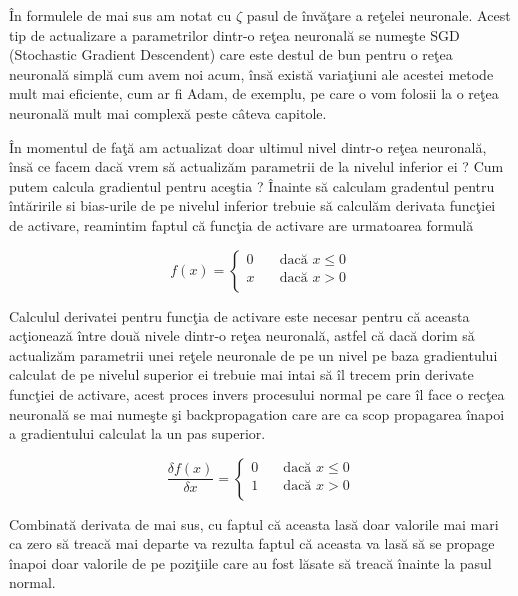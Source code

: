 \^{I}n formulele de mai sus am notat cu $\zeta$ pasul de \^{i}nv\u{a}\c{t}are a re\c{t}elei neuronale. Acest tip de actualizare a parametrilor dintr-o re\c{t}ea neuronal\u{a} se nume\c{s}te SGD (Stochastic Gradient Descendent) care este destul de bun pentru o re\c{t}ea neuronal\u{a} simpl\u{a} cum avem noi acum, \^{i}ns\u{a} exist\u{a} varia\c{t}iuni ale acestei metode mult mai eficiente, cum ar fi Adam, de exemplu, pe care o vom folosii la o re\c{t}ea neuronal\u{a} mult mai complex\u{a} peste c\^{a}teva capitole.

\par

\^{I}n momentul de fa\c{t}\u{a} am actualizat doar ultimul nivel dintr-o re\c{t}ea neuronal\u{a}, \^{i}ns\u{a} ce facem dac\u{a} vrem s\u{a} actualiz\u{a}m parametrii de la nivelul inferior ei ? Cum putem calcula gradientul pentru ace\c{s}tia ? \^{I}nainte s\u{a} calculam gradentul pentru \^{i}nt\u{a}ririle si bias-urile de pe nivelul inferior trebuie s\u{a} calcul\u{a}m derivata func\c{t}iei de activare, reamintim faptul c\u{a} func\c{t}ia de activare are urmatoarea formul\u{a} 

\[ f(x) =
  \begin{cases}
    0       & \quad \text{dac\u{a} } x \leq 0\\
    x  & \quad \text{dac\u{a} } x > 0\\
  \end{cases}
\]

Calculul derivatei pentru func\c{t}ia de activare este necesar pentru c\u{a} aceasta ac\c{t}ioneaz\u{a} \^{i}ntre dou\u{a} nivele dintr-o re\c{t}ea neuronal\u{a}, astfel c\u{a} dac\u{a} dorim s\u{a} actualiz\u{a}m parametrii unei re\c{t}ele neuronale de pe un nivel pe baza gradientului calculat de pe nivelul superior ei trebuie mai intai s\u{a} \^{i}l trecem prin derivate func\c{t}iei de activare, acest proces invers procesului normal pe care \^{i}l face o rec\c{t}ea neuronal\u{a} se mai nume\c{s}te \c{s}i backpropagation care are ca scop propagarea \^{i}napoi a gradientului calculat la un pas superior.

\[ \frac{\delta f(x)}{\delta x}  =
  \begin{cases}
    0       & \quad \text{dac\u{a} } x \leq 0\\
    1  & \quad \text{dac\u{a} } x > 0\\
  \end{cases}
\]

Combinat\u{a} derivata de mai sus, cu faptul c\u{a} aceasta las\u{a} doar valorile mai mari ca zero s\u{a} treac\u{a} mai departe va rezulta faptul c\u{a} aceasta va las\u{a} s\u{a} se propage \^{i}napoi doar valorile de pe pozi\c{t}iile care au fost l\u{a}sate s\u{a} treac\u{a} \^{i}nainte la pasul normal.

